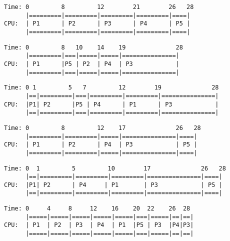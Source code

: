 \documentclass[12pt]{article}
\begin{document}
\begin{lstlisting}[style=ganttstyle, caption={Gantt Chart: FCFS (basic\_test.txt)}, label={lst:gantt_fcfs}]
Time: 0         8         12        21        26   28
      |=========|=========|=========|=========|====|
CPU:  | P1      | P2      | P3      | P4      | P5 |
      |=========|=========|=========|=========|====|
\end{lstlisting}

\begin{lstlisting}[style=ganttstyle, caption={Gantt Chart: SJF - Non-Preemptive (basic\_test.txt)}, label={lst:gantt_sjfnp}]
Time: 0         8   10    14    19              28
      |=========|===|=====|=====|===============|
CPU:  | P1      |P5 | P2  | P4  | P3            |
      |=========|===|=====|=====|===============|
\end{lstlisting}

\begin{lstlisting}[style=ganttstyle, caption={Gantt Chart: SRTF - Preemptive SJF (basic\_test.txt)}, label={lst:gantt_srtf}]
Time: 0 1         5   7         12        19              28
      |==|=========|===|=========|=========|===============|
CPU:  |P1| P2      |P5 | P4      | P1      | P3            |
      |==|=========|===|=========|=========|===============|
\end{lstlisting}

\begin{lstlisting}[style=ganttstyle, caption={Gantt Chart: Priority - Non-Preemptive (basic\_test.txt)}, label={lst:gantt_prio_np}]
Time: 0         8         12    17              26   28
      |=========|=========|=====|===============|====|
CPU:  | P1      | P2      | P4  | P3            | P5 |
      |=========|=========|=====|===============|====|
\end{lstlisting}

\begin{lstlisting}[style=ganttstyle, caption={Gantt Chart: Priority - Preemptive (basic\_test.txt)}, label={lst:gantt_prio_p}]
Time: 0  1         5         10        17              26   28
      |==|=========|=========|=========|===============|====|
CPU:  |P1| P2      | P4     | P1       | P3            | P5 |
      |==|=========|=========|=========|===============|====|
\end{lstlisting}

\begin{lstlisting}[style=ganttstyle, caption={Gantt Chart: Round Robin, Q=4 (basic\_test.txt)}, label={lst:gantt_rr}]
Time: 0     4     8     12    16    20  22    26  28
      |=====|=====|=====|=====|=====|===|=====|==|==|
CPU:  | P1  | P2  | P3  | P4  | P1  |P5 | P3  |P4|P3|
      |=====|=====|=====|=====|=====|===|=====|==|==|
\end{lstlisting}
\end{document}
